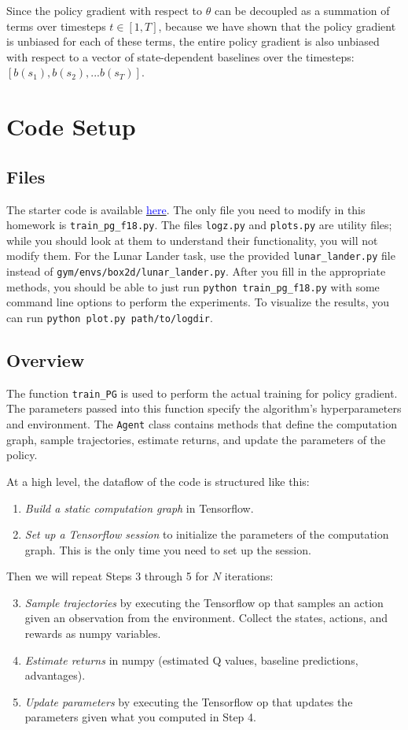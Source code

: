 \documentclass[12pt]{article}
\begin{document}
Since the policy gradient with respect to $\theta$ can be decoupled as a summation of terms over timesteps $t \in [1, T]$, because we have shown that the policy gradient is unbiased for each of these terms,
the entire policy gradient is also unbiased with respect to a vector of state-dependent baselines over the timesteps: $[b(s_1), b(s_2), ... b(s_T)]$.

\section{Code Setup}
\subsection{Files}
The starter code is available \href{https://github.com/berkeleydeeprlcourse/homework/tree/master/hw2}{\textcolor{blue}{here}}.
The only file you need to modify in this homework is \verb|train_pg_f18.py|. The files \verb|logz.py| and \verb|plots.py| are utility files; while you should look at them to understand their functionality, you will not modify them. For the Lunar Lander task, use the provided \verb|lunar_lander.py| file instead of \verb|gym/envs/box2d/lunar_lander.py|. After you fill in the appropriate methods, you should be able to just run \verb|python train_pg_f18.py| with some command line options to perform the experiments. To visualize the results, you can run \verb|python plot.py path/to/logdir|.

\subsection{Overview}
The function \verb|train_PG| is used to perform the actual training for policy gradient. The parameters passed into this function specify the algorithm's hyperparameters and environment. The \verb|Agent| class contains methods that define the computation graph, sample trajectories, estimate returns, and update the parameters of the policy.

At a high level, the dataflow of the code is structured like this:
\begin{enumerate}
    \item \textit{Build a static computation graph} in Tensorflow.
    \item \textit{Set up a Tensorflow session} to initialize the parameters of the computation graph. This is the only time you need to set up the session.
\end{enumerate}
Then we will repeat Steps 3 through 5 for $N$ iterations:
\begin{enumerate}\setcounter{enumi}{2}
    \item \textit{Sample trajectories} by executing the Tensorflow op that samples an action given an observation from the environment. Collect the states, actions, and rewards as numpy variables.
    \item \textit{Estimate returns} in numpy (estimated Q values, baseline predictions, advantages).
    \item \textit{Update parameters} by executing the Tensorflow op that updates the parameters given what you computed in Step 4.
\end{enumerate}
\end{document}
